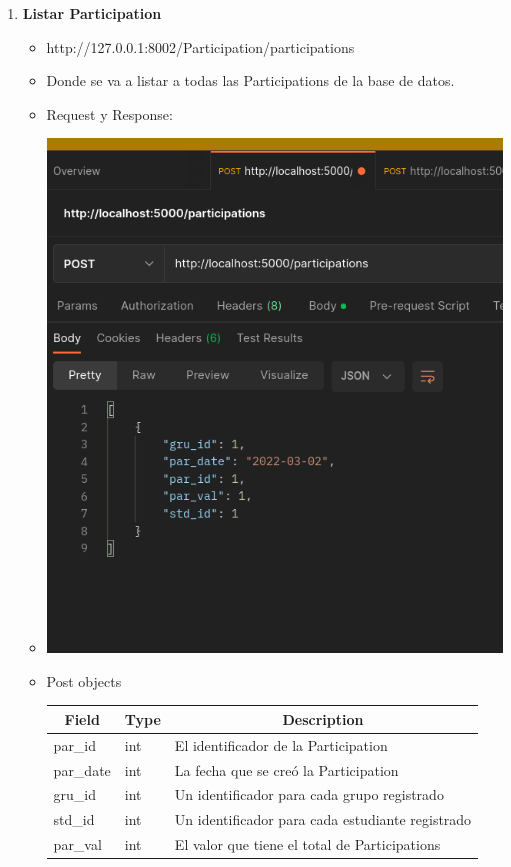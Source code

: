 \documentclass{article}
\begin{document}
\begin{enumerate}
    \item \textbf{Listar Participation}
    \begin{itemize}
        \item http://127.0.0.1:8002/Participation/participations
        \item Donde se va a listar a todas las Participations de la base
        de datos.
        \item Request y Response:
        \item \includegraphics[scale=.5]{assets/participation/participations.png}
        \item Post objects
        \begin{table}[H] \centering \begin{tabular}{|l|l|l|} \hline
        \multicolumn{1}{|c|}{\textbf{Field}} &
        \multicolumn{1}{c|}{\textbf{Type}} &
        \multicolumn{1}{c|}{\textbf{Description}} \\ \hline par\_id & int & El
        identificador de la Participation \\ \hline par\_date & int & La fecha
        que se creó la Participation \\ \hline gru\_id & int & Un identificador
        para cada grupo registrado \\ \hline std\_id & int & Un identificador
        para cada estudiante registrado \\ \hline par\_val & int & El valor que
        tiene el total de Participations \\ \hline \end{tabular} \end{table}
    \end{itemize}


\end{enumerate}
\end{document}
